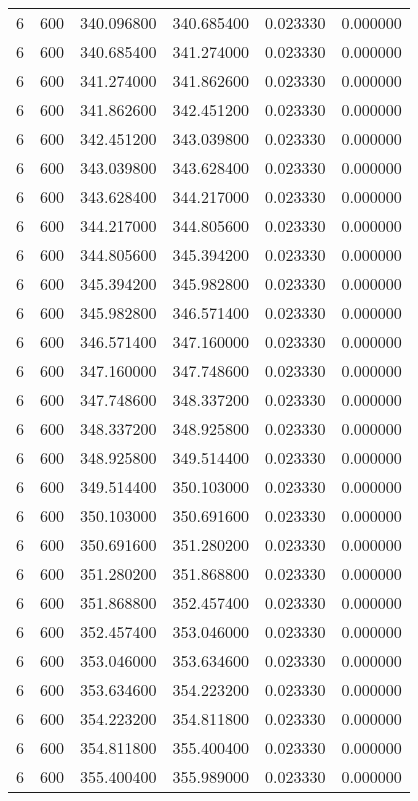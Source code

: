 \begin{longtable}{rrrrrr}
6 & 600 & 340.096800 & 340.685400 & 0.023330 & 0.000000 \\
6 & 600 & 340.685400 & 341.274000 & 0.023330 & 0.000000 \\
6 & 600 & 341.274000 & 341.862600 & 0.023330 & 0.000000 \\
6 & 600 & 341.862600 & 342.451200 & 0.023330 & 0.000000 \\
6 & 600 & 342.451200 & 343.039800 & 0.023330 & 0.000000 \\
6 & 600 & 343.039800 & 343.628400 & 0.023330 & 0.000000 \\
6 & 600 & 343.628400 & 344.217000 & 0.023330 & 0.000000 \\
6 & 600 & 344.217000 & 344.805600 & 0.023330 & 0.000000 \\
6 & 600 & 344.805600 & 345.394200 & 0.023330 & 0.000000 \\
6 & 600 & 345.394200 & 345.982800 & 0.023330 & 0.000000 \\
6 & 600 & 345.982800 & 346.571400 & 0.023330 & 0.000000 \\
6 & 600 & 346.571400 & 347.160000 & 0.023330 & 0.000000 \\
6 & 600 & 347.160000 & 347.748600 & 0.023330 & 0.000000 \\
6 & 600 & 347.748600 & 348.337200 & 0.023330 & 0.000000 \\
6 & 600 & 348.337200 & 348.925800 & 0.023330 & 0.000000 \\
6 & 600 & 348.925800 & 349.514400 & 0.023330 & 0.000000 \\
6 & 600 & 349.514400 & 350.103000 & 0.023330 & 0.000000 \\
6 & 600 & 350.103000 & 350.691600 & 0.023330 & 0.000000 \\
6 & 600 & 350.691600 & 351.280200 & 0.023330 & 0.000000 \\
6 & 600 & 351.280200 & 351.868800 & 0.023330 & 0.000000 \\
6 & 600 & 351.868800 & 352.457400 & 0.023330 & 0.000000 \\
6 & 600 & 352.457400 & 353.046000 & 0.023330 & 0.000000 \\
6 & 600 & 353.046000 & 353.634600 & 0.023330 & 0.000000 \\
6 & 600 & 353.634600 & 354.223200 & 0.023330 & 0.000000 \\
6 & 600 & 354.223200 & 354.811800 & 0.023330 & 0.000000 \\
6 & 600 & 354.811800 & 355.400400 & 0.023330 & 0.000000 \\
6 & 600 & 355.400400 & 355.989000 & 0.023330 & 0.000000 \\

\end{longtable}
